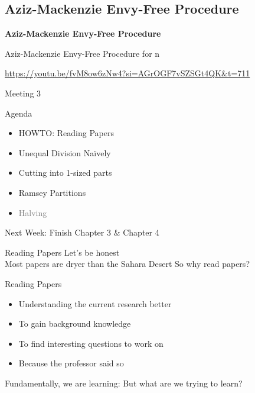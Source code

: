 \documentclass[aspectratio=169,xcolor=dvipsnames]{beamer}
\begin{document}
\subsection{Aziz-Mackenzie Envy-Free Procedure}
\begin{frame}
	\Huge{\centerline{\textbf{Aziz-Mackenzie Envy-Free Procedure}}}
\end{frame}
\begin{frame}{Aziz-Mackenzie Envy-Free Procedure for n}
	\centerline{\url{https://youtu.be/fvM8ow6zNw4?si=AGrOGF7vSZSGt4QK&t=711}}
\end{frame}
\begin{frame}{Meeting 3}
	\begin{block}{Agenda}
		\begin{itemize}
			\item HOWTO: Reading Papers
			\item Unequal Division Na{\"i}vely
			\item Cutting into 1-sized parts
			\item Ramsey Partitions
			\item \textcolor{Gray}{Halving}
		\end{itemize}
	\end{block}
	Next Week: Finish Chapter 3 \& Chapter 4
\end{frame}
\begin{frame}{Reading Papers}
	Let's be honest\\Most papers are dryer than the Sahara Desert\pause
	\newline
	\newline
	So why read papers?
\end{frame}
\begin{frame}{Reading Papers}
	\begin{itemize}
		\item Understanding the current research better \pause
		\item To gain background knowledge \pause
		\item To find interesting questions to work on \pause
		\item Because the professor said so \pause
	\end{itemize}
	Fundamentally, we are learning: But what are we trying to learn?
\end{frame}
\end{document}
